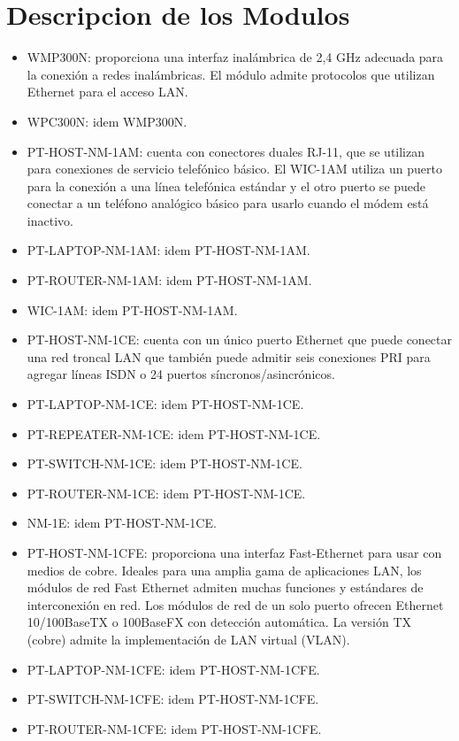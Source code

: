 \documentclass{article}
\begin{document}
\section{Descripcion de los Modulos}
\begin{itemize}
    \item WMP300N: proporciona una interfaz inalámbrica de 2,4 GHz adecuada para la conexión a redes inalámbricas. El módulo admite protocolos que utilizan Ethernet para el acceso LAN.
    \item WPC300N: idem WMP300N.
    
    \item PT-HOST-NM-1AM: cuenta con conectores duales RJ-11, que se utilizan para conexiones de servicio telefónico básico. El WIC-1AM utiliza un puerto para la conexión a una línea telefónica estándar y el otro puerto se puede conectar a un teléfono analógico básico para usarlo cuando el módem está inactivo.
    \item PT-LAPTOP-NM-1AM: idem PT-HOST-NM-1AM.
    \item PT-ROUTER-NM-1AM: idem PT-HOST-NM-1AM.
    \item WIC-1AM: idem PT-HOST-NM-1AM.
    
    \item PT-HOST-NM-1CE: cuenta con un único puerto Ethernet que puede conectar una red troncal LAN que también puede admitir seis conexiones PRI para agregar líneas ISDN o 24 puertos síncronos/asincrónicos.
    \item PT-LAPTOP-NM-1CE: idem PT-HOST-NM-1CE.
    \item PT-REPEATER-NM-1CE: idem PT-HOST-NM-1CE.
    \item PT-SWITCH-NM-1CE: idem PT-HOST-NM-1CE.
    \item PT-ROUTER-NM-1CE: idem PT-HOST-NM-1CE.
    \item NM-1E: idem PT-HOST-NM-1CE.
    
    \item PT-HOST-NM-1CFE: proporciona una interfaz Fast-Ethernet para usar con medios de cobre. Ideales para una amplia gama de aplicaciones LAN, los módulos de red Fast Ethernet admiten muchas funciones y estándares de interconexión en red. Los módulos de red de un solo puerto ofrecen Ethernet 10/100BaseTX o 100BaseFX con detección automática. La versión TX (cobre) admite la implementación de LAN virtual (VLAN).
    \item PT-LAPTOP-NM-1CFE: idem PT-HOST-NM-1CFE.
    \item PT-SWITCH-NM-1CFE: idem PT-HOST-NM-1CFE.
    \item PT-ROUTER-NM-1CFE: idem PT-HOST-NM-1CFE.
    

\end{itemize}
\end{document}
